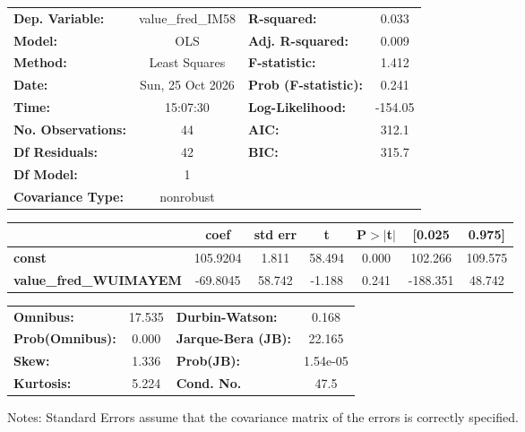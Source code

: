 \begin{center}
\begin{tabular}{lclc}
\toprule
\textbf{Dep. Variable:}        & value\_fred\_IM58 & \textbf{  R-squared:         } &     0.033   \\
\textbf{Model:}                &        OLS        & \textbf{  Adj. R-squared:    } &     0.009   \\
\textbf{Method:}               &   Least Squares   & \textbf{  F-statistic:       } &     1.412   \\
\textbf{Date:}                 &  Sun, 25 Oct 2026 & \textbf{  Prob (F-statistic):} &    0.241    \\
\textbf{Time:}                 &      15:07:30     & \textbf{  Log-Likelihood:    } &   -154.05   \\
\textbf{No. Observations:}     &           44      & \textbf{  AIC:               } &     312.1   \\
\textbf{Df Residuals:}         &           42      & \textbf{  BIC:               } &     315.7   \\
\textbf{Df Model:}             &            1      & \textbf{                     } &             \\
\textbf{Covariance Type:}      &     nonrobust     & \textbf{                     } &             \\
\bottomrule
\end{tabular}
\begin{tabular}{lcccccc}
                               & \textbf{coef} & \textbf{std err} & \textbf{t} & \textbf{P$> |$t$|$} & \textbf{[0.025} & \textbf{0.975]}  \\
\midrule
\textbf{const}                 &     105.9204  &        1.811     &    58.494  &         0.000        &      102.266    &      109.575     \\
\textbf{value\_fred\_WUIMAYEM} &     -69.8045  &       58.742     &    -1.188  &         0.241        &     -188.351    &       48.742     \\
\bottomrule
\end{tabular}
\begin{tabular}{lclc}
\textbf{Omnibus:}       & 17.535 & \textbf{  Durbin-Watson:     } &    0.168  \\
\textbf{Prob(Omnibus):} &  0.000 & \textbf{  Jarque-Bera (JB):  } &   22.165  \\
\textbf{Skew:}          &  1.336 & \textbf{  Prob(JB):          } & 1.54e-05  \\
\textbf{Kurtosis:}      &  5.224 & \textbf{  Cond. No.          } &     47.5  \\
\bottomrule
\end{tabular}
\end{center}

Notes: \newline
 [1] Standard Errors assume that the covariance matrix of the errors is correctly specified.